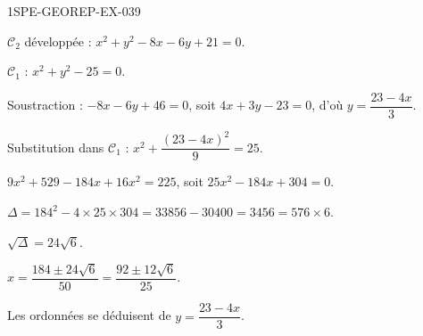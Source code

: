 \begin{corrige}{1SPE-GEOREP-EX-039}


$\mathcal{C}_2$ développée : $x^2 + y^2 - 8x - 6y + 21 = 0$.

$\mathcal{C}_1$ : $x^2 + y^2 - 25 = 0$.

Soustraction : $-8x - 6y + 46 = 0$, soit $4x + 3y - 23 = 0$, d'où $y = \dfrac{23 - 4x}{3}$.

Substitution dans $\mathcal{C}_1$ : $x^2 + \dfrac{(23-4x)^2}{9} = 25$.

$9x^2 + 529 - 184x + 16x^2 = 225$, soit $25x^2 - 184x + 304 = 0$.

$\Delta = 184^2 - 4 \times 25 \times 304 = 33856 - 30400 = 3456 = 576 \times 6$.

$\sqrt{\Delta} = 24\sqrt{6}$.

$x = \dfrac{184 \pm 24\sqrt{6}}{50} = \dfrac{92 \pm 12\sqrt{6}}{25}$.

Les ordonnées se déduisent de $y = \dfrac{23 - 4x}{3}$.

\end{corrige}
